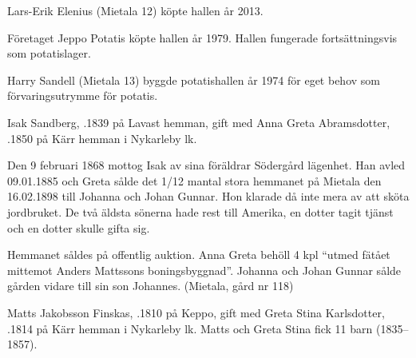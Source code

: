 

Lars-Erik Elenius (Mietala 12) köpte hallen år 2013.\jhvspace{}


Företaget Jeppo Potatis köpte hallen år 1979. Hallen fungerade fortsättningsvis som potatislager.\jhvspace{}


Harry Sandell (Mietala 13) byggde potatishallen år 1974 för eget behov som förvaringsutrymme för potatis.\jhvspace{}





Isak Sandberg, .1839 på Lavast hemman, gift med Anna Greta Abramsdotter,  .1850 på Kärr hemman i Nykarleby lk.
\begin{jhchildren}
  \item {}
  \item {}
  \item {}
  \item {}
  \item {}
  \item {}
  \item {}
\end{jhchildren}

Den 9 februari 1868 mottog Isak av sina föräldrar Södergård lägenhet. Han avled 09.01.1885 och Greta sålde det 1/12 mantal stora hemmanet på Mietala den 16.02.1898 till Johanna och Johan Gunnar. Hon klarade då inte mera av att sköta jordbruket. De två äldsta sönerna hade rest till Amerika, en dotter tagit tjänst och en dotter skulle gifta sig.

Hemmanet såldes på offentlig auktion. Anna Greta behöll 4 kpl ``utmed fätået mittemot Anders Mattssons boningsbyggnad''. Johanna och Johan Gunnar sålde gården vidare till sin son Johannes. (Mietala, gård nr 118)


Matts Jakobsson Finskas, .1810 på Keppo, gift med Greta Stina Karlsdotter,  .1814 på Kärr hemman i Nykarleby lk. Matts och Greta Stina fick 11 barn (1835--1857).

